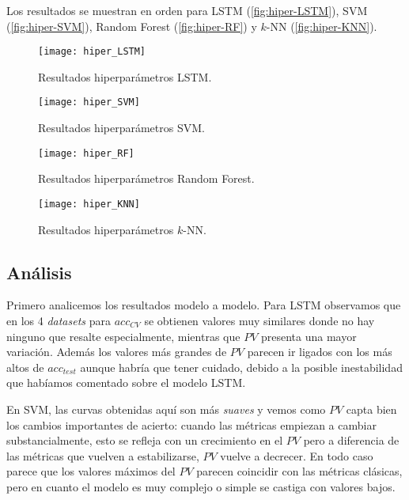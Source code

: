 Los resultados se muestran en orden para LSTM (\autoref{fig:hiper-LSTM}), SVM (\autoref{fig:hiper-SVM}), Random Forest (\autoref{fig:hiper-RF}) y $k$-NN (\autoref{fig:hiper-KNN}).

\begin{figure}[htbp]
  \centering
  \hspace*{-1cm}
  \texttt{[image: hiper\_LSTM]}
  \caption{Resultados hiperparámetros LSTM.}
  \label{fig:hiper-LSTM}
\end{figure}

\begin{figure}[htbp]
  \centering
  \hspace*{-1cm}
  \texttt{[image: hiper\_SVM]}
  \caption{Resultados hiperparámetros SVM.}
  \label{fig:hiper-SVM}
\end{figure}

\begin{figure}[htbp]
  \centering
  \hspace*{-1cm}
  \texttt{[image: hiper\_RF]}
  \caption{Resultados hiperparámetros Random Forest.}
  \label{fig:hiper-RF}
\end{figure}

\begin{figure}[htbp]
  \centering
  \hspace*{-1cm}
  \texttt{[image: hiper\_KNN]}
  \caption{Resultados hiperparámetros $k$-NN.}
  \label{fig:hiper-KNN}
\end{figure}

\subsection{Análisis}

Primero analicemos los resultados modelo a modelo. Para LSTM observamos que en los 4 \emph{datasets} para $acc_{CV}$ se obtienen valores muy similares donde no hay ninguno que resalte especialmente, mientras que $PV$ presenta una mayor variación. Además los valores más grandes de $PV$ parecen ir ligados con los más altos de $acc_{test}$ aunque habría que tener cuidado, debido a la posible inestabilidad que habíamos comentado sobre el modelo LSTM.

En SVM, las curvas obtenidas aquí son más \emph{suaves} y vemos como $PV$ capta bien los cambios importantes de acierto: cuando las métricas empiezan a cambiar substancialmente, esto se refleja con un crecimiento en el $PV$ pero a diferencia de las métricas que vuelven a estabilizarse, $PV$ vuelve a decrecer. En todo caso parece que los valores máximos del $PV$ parecen coincidir con las métricas clásicas, pero en cuanto el modelo es muy complejo o simple se castiga con valores bajos.

